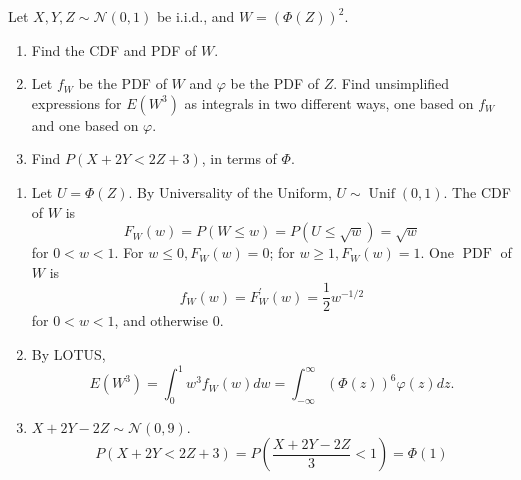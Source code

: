 

\setcounter{theorem}{56}
\begin{exercise}[BH.5.57] Let $X, Y, Z \sim \mathcal{N}(0,1)$ be i.i.d., and $W=(\Phi(Z))^2$.
	\begin{enumerate}
		\item Find the CDF and PDF of $W$.
		\item  Let $f_W$ be the PDF of $W$ and $\varphi$ be the PDF of $Z$. Find unsimplified expressions for $E\left(W^3\right)$ as integrals in two different ways, one based on $f_W$ and one based on $\varphi$.
		\item  Find $P(X+2 Y<2 Z+3)$, in terms of $\Phi$. 
	\end{enumerate}  
\begin{solution}
    \begin{enumerate}
        \item  Let $U=\Phi(Z)$. By Universality of the Uniform, $U \sim \operatorname{Unif}(0,1)$. The CDF of $W$ is
        $$
        F_W(w)=P(W \leq w)=P(U \leq \sqrt{w})=\sqrt{w}
        $$
        for $0<w<1$. For $w \leq 0, F_W(w)=0$; for $w \geq 1, F_W(w)=1$. One $\operatorname{PDF}$ of $W$ is
        $$
        f_W(w)=F_W^{\prime}(w)=\frac{1}{2} w^{-1 / 2}
        $$
        for $0<w<1$, and  otherwise 0.
        \item  By LOTUS,
        $$
        E\left(W^3\right)=\int_0^1 w^3 f_W(w) d w=\int_{-\infty}^{\infty}(\Phi(z))^6 \varphi(z) d z .
        $$
        \item $X+2 Y-2 Z \sim \mathcal{N}(0,9)$.  
        $$
        P(X+2 Y<2 Z+3)=P\left(\frac{X+2 Y-2 Z}{3}<1\right)=\Phi(1)
        $$
    \end{enumerate}
\end{solution}
\end{exercise}


